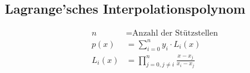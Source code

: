 \documentclass[a4paper,landscape, 11pt]{article}
\begin{document}
\begin{multicols}{4}
\begin{small}
		\subsection{Lagrange'sches Interpolationspolynom}
			\begin{align*}
			n &= \text{Anzahl der Stützstellen}\\
			p(x) &= \sum_{i=0}^{n} y_i \cdot L_i(x) \\
			L_i(x) &= \prod_{j = 0, j \neq i}^{n} \frac{x - x_j}{x_i - x_j}
			\end{align*}
\end{small}
\end{multicols}
\end{document}
